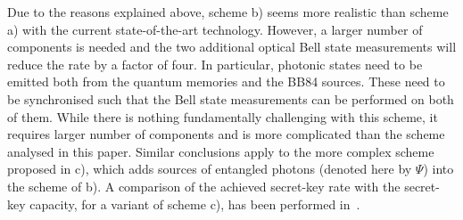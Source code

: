 \documentclass[aps,pra,reprint,superscriptaddress]{revtex4-1}
\begin{document}
Due to the reasons explained above, scheme b) seems more realistic than scheme a) with the current state-of-the-art technology. However, a larger number of components is needed and the two additional optical Bell state measurements will reduce the rate by a factor of four. In particular, photonic states need to be emitted both from the quantum memories and the BB84 sources. These need to be synchronised such that the Bell state measurements can be performed on both of them. While there is nothing fundamentally challenging with this scheme, it requires larger number of components and is more complicated than the scheme analysed in this paper. Similar conclusions apply to the more complex scheme proposed in c), which adds sources of entangled photons (denoted here by $\Psi$) into the scheme of b). A comparison of the achieved secret-key rate with the secret-key capacity, for a variant of scheme c), has been performed in~\cite{2017arXiv170707814L}.
\end{document}
